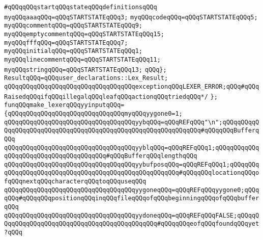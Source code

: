 \verb|#qQQqqQQqstartqQQqstateqQQqdefinitionsqQQq|\newline
\newline
\verb|myqQQqaaaqQQq=qQQqSTARTSTATEqQQq3;|\newline
\verb|myqQQqcodeqQQq=qQQqSTARTSTATEqQQq5;|\newline
\verb|myqQQqcommentqQQq=qQQqSTARTSTATEqQQq9;|\newline
\verb|myqQQqemptycommentqQQq=qQQqSTARTSTATEqQQq15;|\newline
\verb|myqQQqfffqQQq=qQQqSTARTSTATEqQQq7;|\newline
\verb|myqQQqinitialqQQq=qQQqSTARTSTATEqQQq1;|\newline
\verb|myqQQqlinecommentqQQq=qQQqSTARTSTATEqQQq11;|\newline
\verb|myqQQqstringqQQq=qQQqSTARTSTATEqQQq13;|\newline
\newline
\verb|qQQq};|\newline
\verb|ResultqQQq=qQQquser_declarations::Lex_Result;|\newline
\verb|qQQqqQQqqQQqqQQqqQQqqQQqqQQqqQQqqQQqexceptionqQQqLEXER_ERROR;qQQq#qQQqRaisedqQQqifqQQqillegalqQQqleafqQQqactionqQQqtriedqQQq*/|\newline
\verb|};|\newline
\newline
\verb|funqQQqmake_lexerqQQqyyinputqQQq=|\newline
\verb|{qQQqqQQqqQQqqQQqqQQqqQQqqQQqqQQqmyqQQqyygone0=1;|\newline
\verb|qQQqqQQqqQQqqQQqqQQqqQQqqQQqqQQqqQQqyybqQQq=qQQqREFqQQq"\n";qQQqqQQqqQQqqQQqqQQqqQQqqQQqqQQqqQQqqQQqqQQqqQQqqQQqqQQqqQQqqQQq#qQQqqQQqBufferqQQq|\newline
\verb|qQQqqQQqqQQqqQQqqQQqqQQqqQQqqQQqqQQqyyblqQQq=qQQqREFqQQq1;qQQqqQQqqQQqqQQqqQQqqQQqqQQqqQQqqQQqqQQq#qQQqBufferqQQqlengthqQQq|\newline
\verb|qQQqqQQqqQQqqQQqqQQqqQQqqQQqqQQqqQQqyybufposqQQq=qQQqREFqQQq1;qQQqqQQqqQQqqQQqqQQqqQQqqQQqqQQqqQQqqQQqqQQqqQQqqQQqqQQq#qQQqqQQqlocationqQQqofqQQqnextqQQqcharacterqQQqtoqQQquseqQQq|\newline
\verb|qQQqqQQqqQQqqQQqqQQqqQQqqQQqqQQqqQQqyygoneqQQq=qQQqREFqQQqyygone0;qQQqqQQq#qQQqqQQqpositionqQQqinqQQqfileqQQqofqQQqbeginningqQQqofqQQqbufferqQQq|\newline
\verb|qQQqqQQqqQQqqQQqqQQqqQQqqQQqqQQqqQQqyydoneqQQq=qQQqREFqQQqFALSE;qQQqqQQqqQQqqQQqqQQqqQQqqQQqqQQqqQQqqQQqqQQqqQQq#qQQqqQQqeofqQQqfoundqQQqyet?qQQq|\newline
